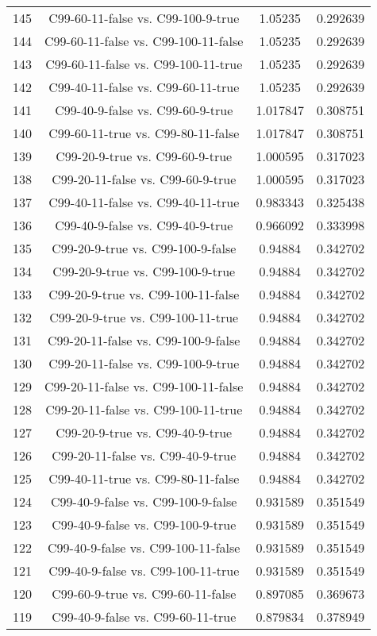 \documentclass[a4paper,10pt]{article}
\begin{document}
\begin{landscape}
\begin{table}[!htp]
\begin{tabular}{cccc}
145&C99-60-11-false vs. C99-100-9-true&1.05235&0.292639\\
144&C99-60-11-false vs. C99-100-11-false&1.05235&0.292639\\
143&C99-60-11-false vs. C99-100-11-true&1.05235&0.292639\\
142&C99-40-11-false vs. C99-60-11-true&1.05235&0.292639\\
141&C99-40-9-false vs. C99-60-9-true&1.017847&0.308751\\
140&C99-60-11-true vs. C99-80-11-false&1.017847&0.308751\\
139&C99-20-9-true vs. C99-60-9-true&1.000595&0.317023\\
138&C99-20-11-false vs. C99-60-9-true&1.000595&0.317023\\
137&C99-40-11-false vs. C99-40-11-true&0.983343&0.325438\\
136&C99-40-9-false vs. C99-40-9-true&0.966092&0.333998\\
135&C99-20-9-true vs. C99-100-9-false&0.94884&0.342702\\
134&C99-20-9-true vs. C99-100-9-true&0.94884&0.342702\\
133&C99-20-9-true vs. C99-100-11-false&0.94884&0.342702\\
132&C99-20-9-true vs. C99-100-11-true&0.94884&0.342702\\
131&C99-20-11-false vs. C99-100-9-false&0.94884&0.342702\\
130&C99-20-11-false vs. C99-100-9-true&0.94884&0.342702\\
129&C99-20-11-false vs. C99-100-11-false&0.94884&0.342702\\
128&C99-20-11-false vs. C99-100-11-true&0.94884&0.342702\\
127&C99-20-9-true vs. C99-40-9-true&0.94884&0.342702\\
126&C99-20-11-false vs. C99-40-9-true&0.94884&0.342702\\
125&C99-40-11-true vs. C99-80-11-false&0.94884&0.342702\\
124&C99-40-9-false vs. C99-100-9-false&0.931589&0.351549\\
123&C99-40-9-false vs. C99-100-9-true&0.931589&0.351549\\
122&C99-40-9-false vs. C99-100-11-false&0.931589&0.351549\\
121&C99-40-9-false vs. C99-100-11-true&0.931589&0.351549\\
120&C99-60-9-true vs. C99-60-11-false&0.897085&0.369673\\
119&C99-40-9-false vs. C99-60-11-true&0.879834&0.378949\\

\end{tabular}
\end{table}
\end{landscape}
\end{document}
